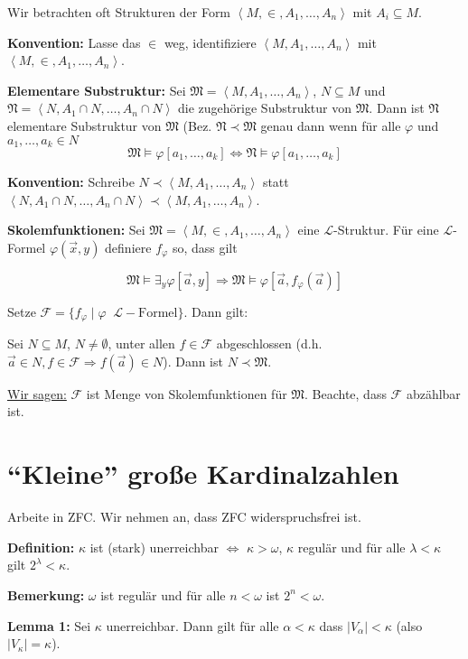 \documentclass[a4paper,fontsize=11pt]{scrartcl}
\begin{document}
Wir betrachten oft Strukturen der Form
$\left<M,\in,A_1,\ldots,A_n\right>$ mit $A_i\subseteq M$.

{\bf Konvention:} Lasse das $\in$ weg, identifiziere
$\left<M,A_1,\ldots,A_n\right>$ mit
$\left<M,\in,A_1,\ldots,A_n\right>$.

{\bf Elementare Substruktur:} Sei
$\mathfrak{M}=\left<M,A_1,\ldots,A_n\right>$, $N\subseteq M$ und
$\mathfrak{N}=\left<N,A_1\cap N,\ldots,A_n\cap N\right>$ die
zugehörige Substruktur von $\mathfrak{M}$. Dann ist $\mathfrak{N}$
elementare Substruktur von $\mathfrak{M}$
(Bez. $\mathfrak{N}\prec\mathfrak{M}$ genau dann wenn für alle
$\varphi$ und $a_1,\ldots,a_k\in N$
$$ \mathfrak{M}\models \varphi[a_1,\ldots,a_k] \Leftrightarrow
\mathfrak{N}\models\varphi[a_1,\ldots,a_k]$$

{\bf Konvention:} Schreibe $N\prec\left<M,A_1,\ldots,A_n\right>$ statt
$\left<N,A_1\cap N,\ldots,A_n\cap
N\right>\prec\left<M,A_1,\ldots,A_n\right>$.

{\bf Skolemfunktionen:} Sei
$\mathfrak{M}=\left<M,\in,A_1,\ldots,A_n\right>$ eine
${\mathcal{L}}$-Struktur. Für eine $\mathcal{L}$-Formel
$\varphi(\vec{x},y)$ definiere $f_\varphi$ so, dass gilt

$$ \mathfrak{M}\models \exists_y \varphi[\vec{a},y] \Rightarrow
\mathfrak{M}\models\varphi[\vec{a},f_\varphi(\vec{a})]$$

Setze
$\mathcal{F}=\{f_\varphi\mid\varphi\phantom{a}\mathcal{L}-\mbox{Formel}\}$. Dann
gilt:

Sei $N\subseteq M$, $N\neq\emptyset$, unter allen $f\in\mathcal{F}$
abgeschlossen (d.h. $\vec{a}\in N,f\in\mathcal{F}\Rightarrow
f(\vec{a})\in N$). Dann ist $N\prec\mathfrak{M}$.

\underline{Wir sagen:} $\mathcal{F}$ ist Menge von Skolemfunktionen
für $\mathfrak{M}$. Beachte, dass $\mathcal{F}$ abzählbar ist.

\section{``Kleine'' große Kardinalzahlen}
Arbeite in ZFC. Wir nehmen an, dass ZFC widerspruchsfrei ist.

{\bf Definition:} $\kappa$ ist (stark) unerreichbar $\Leftrightarrow$
$\kappa>\omega$, $\kappa$ regulär und für alle $\lambda<\kappa$ gilt
$2^\lambda<\kappa$.

{\bf Bemerkung:} $\omega$ ist regulär und für alle $n<\omega$ ist
$2^n<\omega$.

{\bf Lemma 1:} Sei $\kappa$ unerreichbar. Dann gilt für alle
$\alpha<\kappa$ dass $|V_\alpha|<\kappa$ (also $|V_\kappa|=\kappa$).
\end{document}
